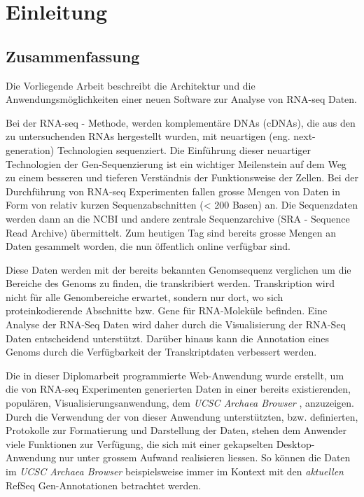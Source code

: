 \documentclass[a4paper]{thesis}
\begin{document}

\renewcommand\contentsname{Inhalt}
\tableofcontents
\listoftodos
\newpage

\section{Einleitung}

\subsection{Zusammenfassung}

Die Vorliegende Arbeit beschreibt die Architektur und die
Anwendungsmöglichkeiten einer neuen Software zur Analyse von RNA-seq Daten.

Bei der RNA-seq - Methode, werden komplementäre DNAs (cDNAs), die aus den zu
untersuchenden RNAs hergestellt wurden, mit neuartigen (eng. next-generation)
Technologien sequenziert. \cite{ausubel_rna-seq:_2010}
%
Die Einführung dieser neuartiger Technologien der Gen-Sequenzierung
ist ein wichtiger Meilenstein auf dem Weg zu einem besseren und
tieferen Verständnis der Funktionsweise der Zellen. Bei der Durchführung
von RNA-seq Experimenten fallen grosse Mengen von Daten in Form von
relativ kurzen Sequenzabschnitten (< 200 Basen) an. Die Sequenzdaten
werden dann an die NCBI und andere zentrale Sequenzarchive (SRA -
Sequence Read Archive) übermittelt. Zum heutigen Tag sind bereits
grosse Mengen an Daten gesammelt worden, die nun öffentlich
online verfügbar sind.

Diese Daten werden mit der bereits bekannten
Genomsequenz verglichen um die Bereiche des Genoms zu finden,
die transkribiert werden. Transkription wird nicht für
alle Genombereiche erwartet, sondern nur dort, wo sich proteinkodierende
Abschnitte bzw. Gene für RNA-Moleküle befinden. Eine Analyse der RNA-Seq
Daten wird daher durch die Visualisierung der RNA-Seq Daten entscheidend
unterstützt. Darüber hinaus kann die Annotation eines Genoms durch die
Verfügbarkeit der Transkriptdaten verbessert werden.

Die in dieser Diplomarbeit programmierte Web-Anwendung wurde erstellt, um
die von RNA-seq
Experimenten generierten Daten in einer bereits existierenden, populären,
Visualisierungsanwendung, dem {\em UCSC Archaea Browser}
\cite{schneider_ucsc_2006}, anzuzeigen. Durch die Verwendung der von dieser
Anwendung unterstützten, bzw. definierten, Protokolle zur Formatierung
und Darstellung der Daten, stehen dem Anwender viele Funktionen zur
Verfügung, die sich mit einer gekapselten Desktop-Anwendung nur unter
grossem Aufwand realisieren liessen. So können die Daten im {\em UCSC Archaea
Browser} beispielsweise immer im Kontext mit den {\em aktuellen} RefSeq
Gen-Annotationen betrachtet werden.
\end{document}
